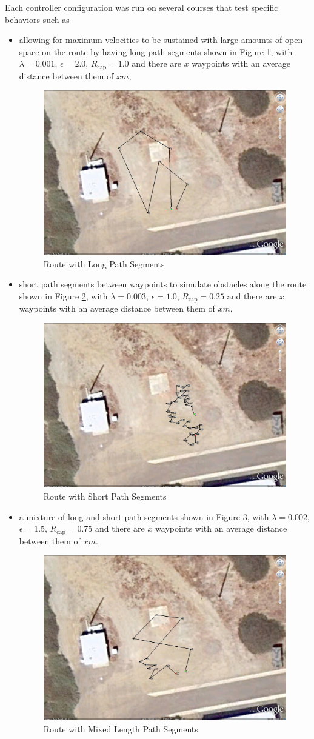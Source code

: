 Each controller configuration was run on several courses that test specific behaviors such as
\begin{itemize}
\item allowing for maximum velocities to be sustained with large amounts of open space on the route by having long path segments shown in Figure \ref{fig:routeLong}, with $\lambda = 0.001$, $\epsilon = 2.0$, $R_{\text{cap}} = 1.0$ and there are $x$ waypoints with an average distance between them of $x m$,
\begin{figure}[ht!]
	\centering
	\includegraphics[width=.5\textwidth]{images/GE/GELongSegmentsRoute}
	\caption{Route with Long Path Segments}
	\label{fig:routeLong}
\end{figure}
\item short path segments between waypoints to simulate obstacles along the route shown in Figure \ref{fig:routeShort}, with $\lambda = 0.003$, $\epsilon = 1.0$, $R_{\text{cap}} = 0.25$ and there are $x$ waypoints with an average distance between them of $x m$,
\begin{figure}[ht!]
	\centering
	\includegraphics[width=.5\textwidth]{images/GE/GEShortSegmentsRoute}
	\caption{Route with Short Path Segments}
	\label{fig:routeShort}
\end{figure}
\item a mixture of long and short path segments shown in Figure \ref{fig:routeMixed}, with $\lambda = 0.002$, $\epsilon = 1.5$, $R_{\text{cap}} = 0.75$ and there are $x$ waypoints with an average distance between them of $x m$.
\begin{figure}[ht!]
	\centering
	\includegraphics[width=.5\textwidth]{images/GE/GEMixedSegmentsRoute}
	\caption{Route with Mixed Length Path Segments}
	\label{fig:routeMixed}
\end{figure}
\end{itemize}
